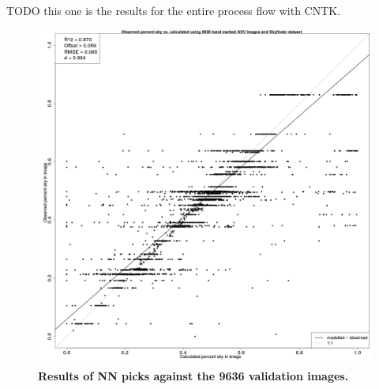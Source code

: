 \documentclass[final,3p,times,authoryear]{elsarticle}
\begin{document}
TODO this one is the results for the entire process flow with CNTK.
\begin{figure}
\centering
\includegraphics[scale=0.12]{Images/ErrorPlotsCNTK.png}
\caption{\textbf{Results of NN picks against the 9636 validation images.}}
\label{fig:errorplotscntk}
\end{figure}
\end{document}
